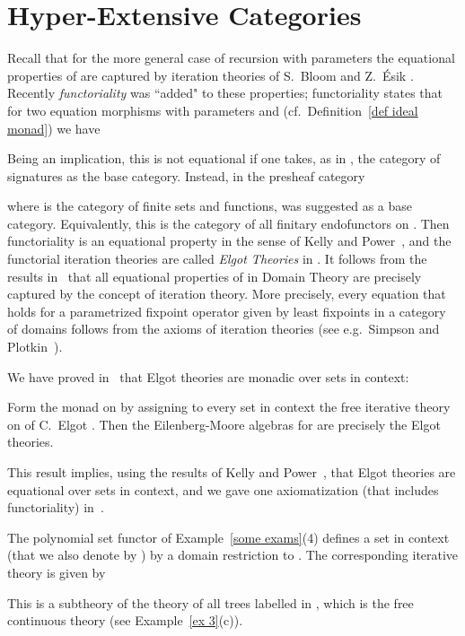\documentclass{LMCS}
\theoremstyle{plain}
\theoremstyle{definition}
\numberwithin{equation}{section}
\begin{document}
\section{Hyper-Extensive Categories}
Recall that for the more general case of recursion with parameters the equational properties of  are captured by iteration theories of S.~Bloom and Z.~\'{E}sik \cite{be}. Recently \emph{functoriality} was ``added" to these properties; functoriality states that for two equation morphisms with parameters  and  (cf.~Definition~\ref{def ideal monad}) we have

Being an implication, this is not equational if one takes, as in \cite{be}, the category of signatures as the base category. Instead, in \cite{amv_em2} the presheaf category

where  is the category of finite sets and functions, was
suggested as a base category. Equivalently, this is the category of
all finitary endofunctors on .  Then functoriality is an
equational property in the sense of Kelly and Power~\cite{kp93}, and the functorial iteration theories are called {\it Elgot Theories} in \cite{amv_em2}. It follows from the results
in~\cite{be} that all equational properties of  in Domain
Theory are precisely captured by the concept of iteration theory.  More precisely, every equation that holds for a parametrized fixpoint operator  given by least fixpoints in a category of domains follows from the axioms of iteration theories (see e.g.~Simpson and Plotkin~\cite{sp00}). 

We have proved in~\cite{amv_em2} that Elgot theories are monadic over sets in context:
\begin{thm}\label{eilenberg-moore alg for M=elgot theo}
 Form the monad  on  by assigning to every set in context  the free iterative theory on  of C.~Elgot \cite{elgot}. Then the Eilenberg-Moore algebras for   are precisely the  Elgot theories.
\end{thm}
This result implies, using the results of Kelly and Power~\cite{kp93}, that Elgot theories are equational over sets in context, and we gave one axiomatization (that includes functoriality) in~\cite{amv_em2}. 


\begin{exa}
  The polynomial set functor  of Example~\ref{some exams}(4) defines a set in context (that we also denote by ) by a domain restriction to . The corresponding iterative theory  is given by
  
  This is a subtheory of the theory  of all trees labelled in , which is the free continuous theory (see Example~\ref{ex 3}(c)).
\end{exa}
\end{document}
